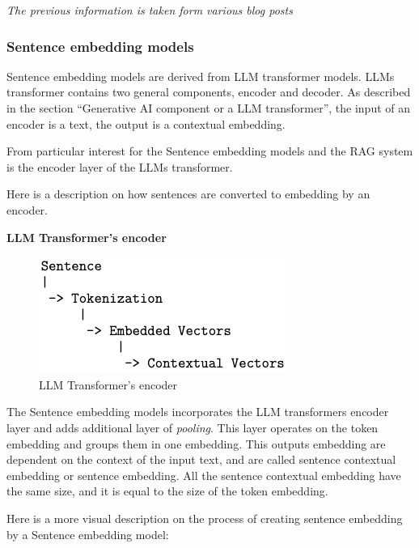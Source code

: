 \documentclass{wseas}
\begin{document}
\emph{The previous information is taken form various blog posts} \cite{cite9} \cite{cite10} \cite{cite11} 
\cite{cite12} \cite{cite13} \cite{cite14} \cite{cite15} \cite{cite16}

\subsubsection{Sentence embedding models}

Sentence embedding models are derived from LLM transformer models. LLMs
transformer contains two general components, encoder and decoder. As
described in the section ``Generative AI component or a LLM
transformer'', the input of an encoder is a text, the output is a
contextual embedding.

From particular interest for the Sentence embedding models and the RAG
system is the encoder layer of the LLMs transformer.

Here is a description on how sentences are converted to embedding by an
encoder.

\textbf{LLM Transformer's encoder}

\begin{figure}[htbp]{}
  \centering
  \includegraphics[width=\linewidth]{resources/v1/transformerEncoder.png}
  \caption{LLM Transformer's encoder}
  \label{fig:encoder_layer_figure}
\end{figure}

The Sentence embedding models incorporates the LLM transformers encoder
layer and adds additional layer of \emph{pooling}. This layer operates
on the token embedding and groups them in one embedding. This outputs
embedding are dependent on the context of the input text, and are called
sentence contextual embedding or sentence embedding. All the sentence
contextual embedding have the same size, and it is equal to the size of
the token embedding.


Here is a more visual description on the process of creating sentence
embedding by a Sentence embedding model:
\end{document}
